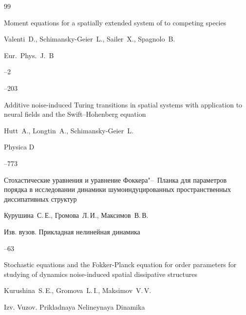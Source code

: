 \begin{thebibliography}{99}

\paper Moment equations for a spatially extended system of to competing species

\by Valenti~D., Schimansky-Geier~L., Sailer~X., Spagnolo~B.

\jour Eur.~Phys.~J.~B



--2

--203




\paper Additive noise-induced Turing transitions in spatial systems with application to neural fields and the Swift–Hohenberg equation

\by Hutt~A., Longtin~A., Schimansky-Geier~L.

\jour  Physica D




--773






\paper Стохастические уравнения и уравнение Фоккера"--~Планка для параметров порядка в исследовании динамики шумоиндуцированных пространственных диссипативных структур

\by  Курушина~С.\,Е., Громова~Л.\,И., Максимов~В.\,В.

\jour Изв. вузов. Прикладная нелинейная динамика




--63


\misctransl

\paper Stochastic equations and the Fokker-Planck equation for order parameters for studying of dynamics noise-induced spatial dissipative structures

\by Kurushina~S.\,E., Gromova~L.\,I., Maksimov~V.\,V.

\jour Izv. Vuzov. Prikladnaya Nelineynaya Dinamika





\end{thebibliography}
